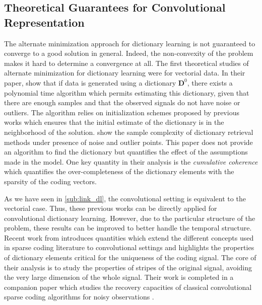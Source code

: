 \documentclass[../thesis.tex]{subfiles}
\begin{document}


	
	
\subsection{Theoretical Guarantees for Convolutional Representation}
\label{sub:conv_dl_theory}


	The alternate minimization approach for dictionary learning is not guaranteed to
	converge to a good solution in general. Indeed, the non-convexity of the problem
	makes it hard to determine a convergence at all. The first theoretical studies of
	alternate minimization for dictionary learning were for vectorial data. In their
	paper, \citet{Agarwal2014} show that if data is generated using a dictionary
	$ \pmb D^0$, there exists a polynomial time algorithm which permits estimating
	this dictionary, given that there are enough samples and that the observed signals
	do not have noise or outliers. The algorithm relies on initialization schemes
	proposed by previous works \citep{Arora2013, Agarwal2013} which ensures that the
	initial estimate of the dictionary is in the neighborhood of the solution.
	\citet{Gribonval2015} show the sample complexity of dictionary retrieval methods
	under presence of noise and outlier points. This paper does not provide an algorithm
	to find the dictionary but quantifies the effect of the assumptions made in the
	model. One key quantity in their analysis is the \emph{cumulative coherence} which
	quantifies the over-completeness of the dictionary elements with the sparsity of
	the coding vectors.

	As we have seen in \autoref{sub:link_dl}, the convolutional setting is equivalent
	to the vectorial case. Thus, these previous works can be directly applied for
	convolutional dictionary learning. However, due to the particular structure
	of the problem, these results can be improved to better handle the temporal structure.
	Recent work from \cite{Papyan2017a} introduces quantities which extend the different
	concepts used in sparse coding literature to convolutional settings and highlights
	the properties of dictionary elements critical for the uniqueness of the coding signal.
	The core of their analysis is to study the properties of stripes of the original signal,
	avoiding the very large dimension of the whole signal. Their work is completed in
	a companion paper which studies the recovery capacities of classical convolutional
	sparse coding algorithms for noisy observations \citep{Papyan2016a}.

	


\biblio{}
\end{document}
